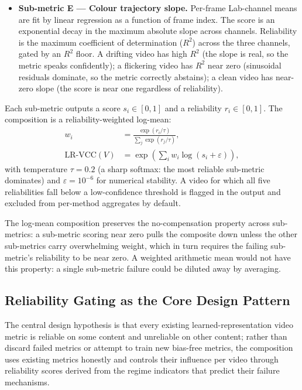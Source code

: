 \begin{itemize}
    \item \textbf{Sub-metric E --- Colour trajectory slope.} Per-frame Lab-channel means
          are fit by linear regression as a function of frame index. The score is an
          exponential decay in the maximum absolute slope across channels. Reliability is
          the maximum coefficient of determination ($R^2$) across the three channels, gated
          by an $R^2$ floor. A drifting video has high $R^2$ (the slope is real, so the
          metric speaks confidently); a flickering video has $R^2$ near zero (sinusoidal
          residuals dominate, so the metric correctly abstains); a clean video has
          near-zero slope (the score is near one regardless of reliability).
\end{itemize}

Each sub-metric outputs a score $s_i \in [0, 1]$ and a reliability $r_i \in [0, 1]$. The
composition is a reliability-weighted log-mean:
\begin{align}
    w_i &= \frac{\exp(r_i / \tau)}{\sum_j \exp(r_j / \tau)}, \\
    \text{LR-VCC}(V) &= \exp\!\left(\sum_{i} w_i \log(s_i + \varepsilon)\right),
\end{align}
with temperature $\tau = 0.2$ (a sharp softmax: the most reliable sub-metric dominates) and
$\varepsilon = 10^{-6}$ for numerical stability. A video for which all five reliabilities
fall below a low-confidence threshold is flagged in the output and excluded from
per-method aggregates by default.

The log-mean composition preserves the no-compensation property across sub-metrics: a
sub-metric scoring near zero pulls the composite down unless the other sub-metrics carry
overwhelming weight, which in turn requires the failing sub-metric's reliability to be near
zero. A weighted arithmetic mean would not have this property: a single sub-metric failure
could be diluted away by averaging.

\subsection{Reliability Gating as the Core Design Pattern}

The central design hypothesis is that every existing learned-representation video metric is
reliable on some content and unreliable on other content; rather than discard failed
metrics or attempt to train new bias-free metrics, the composition uses existing metrics
honestly and controls their influence per video through reliability scores derived from
the regime indicators that predict their failure mechanisms.

